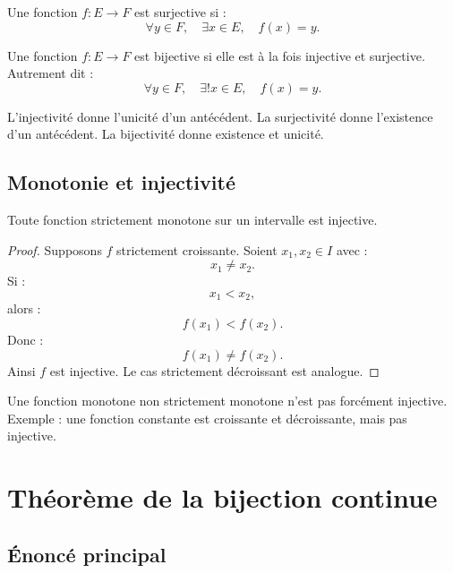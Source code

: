 \documentclass[11pt,a4paper]{article}
\begin{document}
\begin{definitionbox}[Surjectivité]
Une fonction \(f:E\to F\) est surjective si :
\[
\forall y\in F,\quad \exists x\in E,\quad f(x)=y.
\]
\end{definitionbox}

\begin{definitionbox}[Bijectivité]
Une fonction \(f:E\to F\) est bijective si elle est à la fois injective et surjective.  
Autrement dit :
\[
\forall y\in F,\quad \exists! x\in E,\quad f(x)=y.
\]
\end{definitionbox}

\begin{retenirbox}
L'injectivité donne l'unicité d'un antécédent.  
La surjectivité donne l'existence d'un antécédent.  
La bijectivité donne existence et unicité.
\end{retenirbox}

\subsection{Monotonie et injectivité}

\begin{theorembox}
Toute fonction strictement monotone sur un intervalle est injective.
\end{theorembox}

\begin{proof}
Supposons \(f\) strictement croissante.  
Soient \(x_1,x_2\in I\) avec :
\[
x_1\neq x_2.
\]
Si :
\[
x_1<x_2,
\]
alors :
\[
f(x_1)<f(x_2).
\]
Donc :
\[
f(x_1)\neq f(x_2).
\]
Ainsi \(f\) est injective.  
Le cas strictement décroissant est analogue.
\end{proof}

\begin{erreurbox}
Une fonction monotone non strictement monotone n'est pas forcément injective.  
Exemple : une fonction constante est croissante et décroissante, mais pas injective.
\end{erreurbox}

\section{Théorème de la bijection continue}

\subsection{Énoncé principal}
\end{document}
